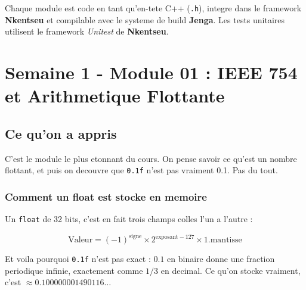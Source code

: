 \documentclass[12pt,a4paper]{report}
\newcommand{\code}[1]{\texttt{\textcolor{PrimaryBlue}{#1}}}
\newcommand{\NKE}{\textbf{\textcolor{PrimaryBlue}{Nkentseu}}}
\newcommand{\JGA}{\textbf{\textcolor{PrimaryBlue}{Jenga}}}
\begin{document}
\medskip

Chaque module est code en tant qu'en-tete C++ (\code{.h}), integre dans le framework \NKE{} et compilable avec le systeme de build \JGA{}. Les tests unitaires utilisent le framework \textit{Unitest} de \NKE{}.

\chapter{Semaine 1 - Module 01 : IEEE 754 et Arithmetique Flottante}

\section{Ce qu'on a appris}

C'est le module le plus etonnant du cours. On pense savoir ce qu'est un nombre flottant, et puis on decouvre que \code{0.1f} n'est pas vraiment 0.1. Pas du tout.

\subsection*{Comment un float est stocke en memoire}

Un \code{float} de 32 bits, c'est en fait trois champs colles l'un a l'autre :

\begin{center}
\end{center}

\[
\text{Valeur} = (-1)^{\text{signe}} \times 2^{\text{exposant}-127} \times 1.\text{mantisse}
\]

Et voila pourquoi \code{0.1f} n'est pas exact : $0.1$ en binaire donne une fraction periodique infinie, exactement comme $1/3$ en decimal. Ce qu'on stocke vraiment, c'est $\approx 0.100000001490116\ldots$
\end{document}
